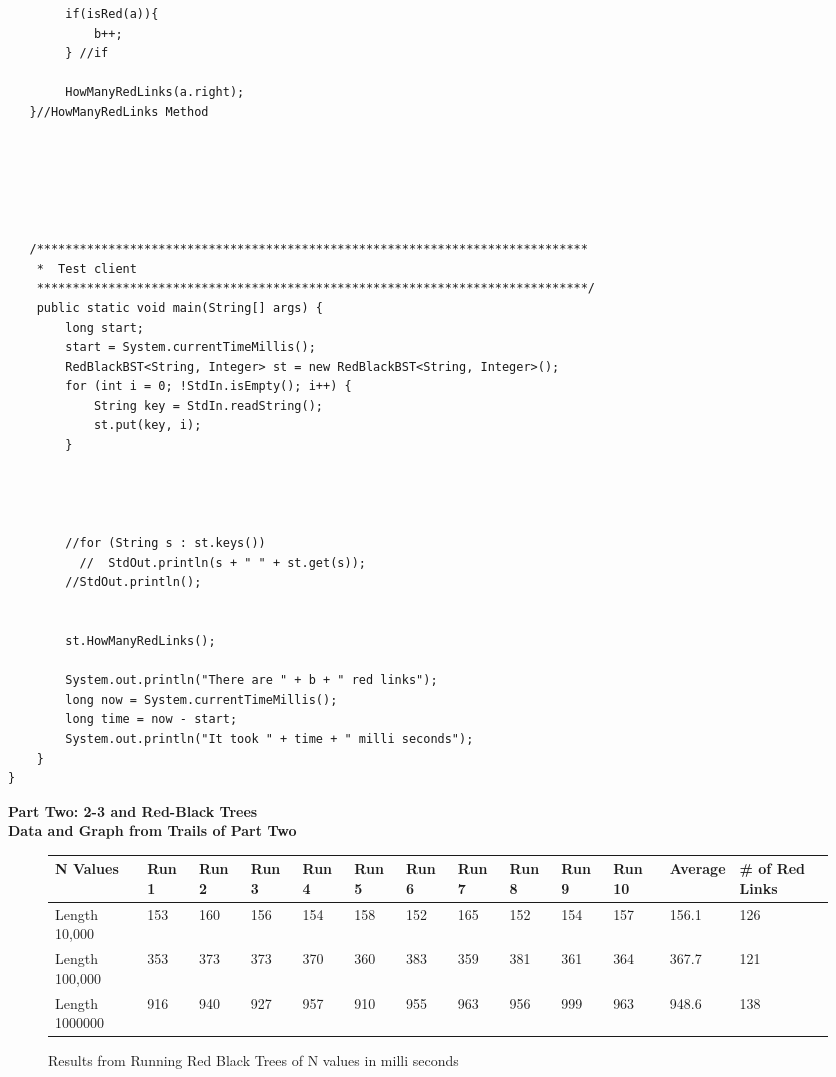 \documentclass{article}
\begin{document}
\begin{lstlisting}
   		if(isRed(a)){
   			b++;
   		} //if

   		HowManyRedLinks(a.right);
   }//HowManyRedLinks Method






   /*****************************************************************************
    *  Test client
    *****************************************************************************/
    public static void main(String[] args) { 
    	long start;
    	start = System.currentTimeMillis();
        RedBlackBST<String, Integer> st = new RedBlackBST<String, Integer>();
        for (int i = 0; !StdIn.isEmpty(); i++) {
            String key = StdIn.readString();
            st.put(key, i);
        }


       

        //for (String s : st.keys())
          //  StdOut.println(s + " " + st.get(s));
        //StdOut.println();


        st.HowManyRedLinks();

        System.out.println("There are " + b + " red links");
        long now = System.currentTimeMillis();
        long time = now - start;
        System.out.println("It took " + time + " milli seconds");
    }
}

\end{lstlisting}
\newpage
\begin{center}
\textbf{Part Two: 2-3 and Red-Black Trees \\ Data and Graph from Trails of Part Two}
\end{center}
\begin{figure}[H]
\centering
\begin{adjustwidth}{-4.4cm}{}
\begin{tabular}{| l | l | l | l | l | l | l | l | l | l | l | l | l |}
\hline
N Values & Run 1 & Run 2 & Run 3 & Run 4 & Run 5 & Run 6 & Run 7 & Run 8 & Run 9 & Run 10 & Average & \# of Red Links\\ \hline
Length 10,000 & 153 & 160 & 156  & 154  & 158 &  152 & 165 & 152 & 154 & 157 & 156.1 & 126\\ \hline
Length 100,000& 353 & 373 & 373 & 370 & 360 &  383 & 359 & 381 & 361 & 364 & 367.7 & 121\\ \hline
Length 1000000 & 916 & 940 & 927 & 957 & 910 & 955 & 963 & 956 & 999 & 963 & 948.6 & 138\\ \hline
\end{tabular}
\caption{Results from Running Red Black Trees of N values in milli seconds}
\end{adjustwidth}
\end{figure}
\end{document}
